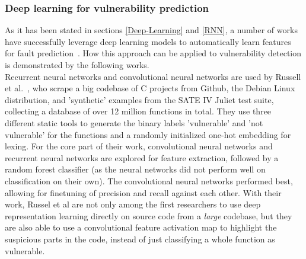 \documentclass[
a4paper,
pagesize,
pdftex,
12pt,
twoside, %
BCOR=5mm, %
ngerman,
fleqn,
final,
]{scrartcl}
\begin{document}
	\subsubsection{Deep learning for vulnerability prediction}\label{deep-vulnerability-prediction}
	As it has been stated in sections \ref{Deep-Learning} and \ref{RNN}, a number of works have successfully leverage deep learning models to automatically learn features for fault prediction~\cite{IEEE.2015b,IEEE.2016,Wang.2016}. How this approach can be applied to vulnerability detection is demonstrated by the following works.\\
	Recurrent neural networks and convolutional neural networks are used by Russell et al.~\cite{Russell.2018}, who scrape a big codebase of C projects from Github, the Debian Linux distribution, and 'synthetic' examples from the SATE IV Juliet test suite, collecting a database of over 12 million functions in total. They use three different static tools to generate the binary labels 'vulnerable' and 'not vulnerable' for the functions and a randomly initialized one-hot embedding for lexing. For the core part of their work, convolutional neural networks and recurrent neural networks are explored for feature extraction, followed by a random forest classifier (as the neural networks did not perform well on classification on their own). The convolutional neural networks performed best, allowing for finetuning of precision and recall against each other. With their work, Russel et al are not only among the first researchers to use deep representation learning directly on source code from a \textit{large} codebase, but they are also able to use a convolutional feature activation map to highlight the suspicious parts in the code, instead of just classifying a whole function as vulnerable.\\
\end{document}
